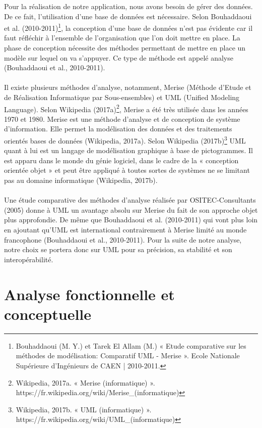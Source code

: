 Pour la réalisation de notre application, nous avons besoin de gérer des données. De ce fait, l'utilisation d'une base de données est nécessaire. Selon Bouhaddaoui et al. (2010-2011)\footnote{Bouhaddaoui (M. Y.) et Tarek El Allam (M.) « Etude comparative sur les méthodes de modélisation: Comparatif UML - Merise ». Ecole Nationale Supérieure d'Ingénieurs de CAEN | 2010-2011.}, la conception d'une base de données n'est pas évidente car il faut réfléchir à l'ensemble de l'organisation que l'on doit mettre en place. La phase de conception nécessite des méthodes permettant de mettre en place un modèle sur lequel on va s'appuyer. Ce type de méthode est appelé analyse (Bouhaddaoui et al., 2010-2011).
\\$ $\\Il existe plusieurs méthodes d'analyse, notamment, Merise (Méthode d’Etude et de Réalisation Informatique par Sous-ensembles) et UML (Unified Modeling Language).
Selon Wikipedia (2017a)\footnote{Wikipedia, 2017a. « Merise (informatique) ». https://fr.wikipedia.org/wiki/Merise\_(informatique)}, Merise a été très utilisée dans les années 1970 et 1980. Merise est une méthode d’analyse et de conception de système d’information. Elle permet la modélisation des données et des traitements orientés bases de données (Wikipedia, 2017a). Selon Wikipedia (2017b)\footnote{Wikipedia, 2017b. « UML (informatique) ». https://fr.wikipedia.org/wiki/UML\_(informatique)} UML quant à lui est un langage de modélisation graphique à base de pictogrammes. Il est apparu dans le monde du génie logiciel, dans le cadre de la « conception orientée objet » et peut être appliqué à toutes sortes de systèmes ne se limitant pas au domaine informatique (Wikipedia, 2017b).
\\$ $\\Une étude comparative des méthodes d’analyse réalisée par OSITEC-Consultants (2005) donne à UML un avantage absolu sur Merise du fait de son approche objet plus approfondie. De même que Bouhaddaoui et al. (2010-2011) qui vont plus loin en ajoutant qu’UML est international contrairement à Merise limité au monde francophone (Bouhaddaoui et al., 2010-2011).
Pour la suite de notre analyse, notre choix se portera donc sur UML pour sa précision, sa stabilité et son interopérabilité.

\newpage
\section{Analyse fonctionnelle et conceptuelle} 

